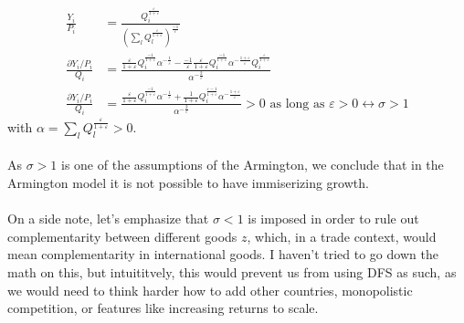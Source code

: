 \documentclass[10pt, final]{article}
\def\a{\alpha}
\def\e{\varepsilon}
\def\s{\sigma}
\newcommand{\pa}{\mathcal \partial}
\begin{document}
\begin{align*}
	\frac{Y_i}{P_i} &= \frac{Q_i^{\frac{\e}{1+\e}}}{(\sum_l Q_l^{\frac{\e}{1+\e}})^{\frac{-1}{\e}}} \\
	\frac{\pa Y_i / P_i}{Q_i} &= \frac{\frac{\e}{1 + \e} Q_i^{\frac{-1}{1+\e}} \alpha^{-\frac{1}{\e}} - \frac{-1}{\e} \frac{\e}{1+\e} Q_i^{\frac{-1}{1+\e}} \a^{-\frac{1+\e}{\e}} Q_i^{\frac{\e}{1+\e}}}{\a^{-\frac{2}{\e}}} \\
	\frac{\pa Y_i / P_i}{Q_i} &= \frac{\frac{\e}{1 + \e} Q_i^{\frac{-1}{1+\e}} \alpha^{-\frac{1}{\e}} + \frac{1}{1+\e} Q_i^{\frac{\e-1}{1+\e}} \a^{-\frac{1+\e}{\e}}}{\a^{-\frac{2}{\e}}} > 0 \text{ as long as } \e > 0 \leftrightarrow \s > 1 
\end{align*}
with $\a = \sum_l Q_l^{\frac{\e}{1+\e}} > 0$. 
\\
\\
As $\s > 1$ is one of the assumptions of the Armington, we conclude that in the Armington model it is not possible to have immiserizing growth.
\\
\\
On a side note, let's emphasize that $\sigma < 1$ is imposed in order to rule out complementarity between different goods $z$, which, in a trade context, would mean complementarity in international goods. I haven't tried to go down the math on this, but intuititvely, this would prevent us from using DFS as such, as we would need to think harder how to add other countries, monopolistic competition, or features like increasing returns to scale.
\end{document}
